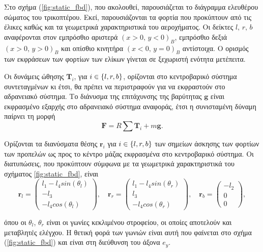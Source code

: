 Στο σχήμα (\ref{fig:static_fbd}), που ακολουθεί, παρουσιάζεται το διάγραμμα
ελευθέρου σώματος του τρικοπτέρου. Εκεί, παρουσιάζονται τα φορτία που
προκύπτουν από τις έλικες καθώς και τα γεωμετρικά χαρακτηριστικά του
αεροχήματος. Οι δείκτες \(l,\, r,\, b\) αναφέρονται στον εμπρόσθιο αριστερά
$(\scriptstyle {x>0,\, y<0})_B$, εμπρόσθιο δεξιά $(\scriptstyle x>0,\,y>0)_B$ 
και οπίσθιο κινητήρα $(\scriptstyle x<0,\,y=0)_B$ αντίστοιχα. Ο ορισμός των
εκφράσεων των φορτίων των ελίκων γίνεται σε ξεχωριστή ενότητα μετέπειτα.

Οι δυνάμεις ώθησης \(\mathbf{T}_i\), για \(i\in\set{l, r, b}\), ορίζονται στο
κεντροβαρικό σύστημα συντεταγμένων κι έτσι, θα πρέπει να περιστραφούν για να
εκφραστούν στο αδρανειακό σύστημα. Το διάνυσμα της επιτάχυνσης της βαρύτητας 
$\mathbf{g}$ είναι εκφρασμένο εξαρχής στο αδρανειακό σύστημα αναφοράς, έτσι η 
συνισταμένη δύναμη παίρνει τη μορφή
\begin{equation}
    \mathbf{F}  = R \sum \mathbf{T}_i + m\mathbf{g}.
\end{equation}

Ορίζονται τα διανύσματα θέσης \(\mathbf{r}_i\) για \(i\in\set{l, r, b}\) των
σημείων άσκησης των φορτίων των προπελών ως προς το κέντρο μάζας εκφρασμένα στο 
κεντροβαρικό σύστημα. Οι διατυπώσεις, που προκύπτουν σύμφωνα με τα γεωμετρικά 
χαρακτηριστικά του σχήματος \ref{fig:static_fbd}, είναι
\begin{equation*}
    \mathbf{r}_l =
    \begin{pmatrix}
        {l_1 - l_4 sin(\theta_l)} \\
        {-l_3}                     \\
        {-l_4 cos(\theta_l)}
    \end{pmatrix}
    ,\quad \mathbf{r}_r =
    \begin{pmatrix}
        {l_1 - l_4 sin(\theta_r)} \\
        {l_3}                    \\
        {-l_4 cos(\theta_r)}
    \end{pmatrix}
    ,\quad \mathbf{r}_b =
    \begin{pmatrix}
        {-l_2} \\
        {0}    \\
        {0}
    \end{pmatrix},
\end{equation*}

\noindent όπου οι \(\theta_l\), \(\theta_r\) είναι οι γωνίες κεκλιμένου 
στροφείου, οι οποίες αποτελούν και μεταβλητές ελέγχου. Η θετική φορά των γωνιών 
είναι αυτή που φαίνεται στο σχήμα (\ref{fig:static_fbd}) και είναι στη διεύθυνση
του άξονα \(e_y\).

